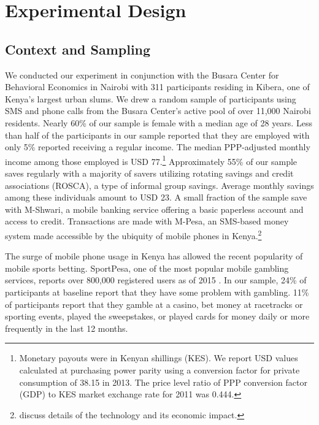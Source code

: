 \documentclass[11pt]{article}
\begin{document}
\section{Experimental Design} \label{sec:design}

	\subsection{Context and Sampling}

		We conducted our experiment in conjunction with the Busara Center for Behavioral Economics in Nairobi with 311 participants residing in Kibera, one of Kenya's largest urban slums. We drew a random sample of participants using SMS and phone calls from the Busara Center's active pool of over 11,000 Nairobi residents. Nearly 60\% of our sample is female with a median age of 28 years. Less than half of the participants in our sample reported that they are employed with only 5\% reported receiving a regular income. The median PPP-adjusted monthly income among those employed is USD 77.\footnote{Monetary payouts were in Kenyan shillings (KES). We report USD values calculated at purchasing power parity using a conversion factor for private consumption of 38.15 in 2013. The price level ratio of PPP conversion factor (GDP) to KES market exchange rate for 2011 was 0.444.} Approximately 55\% of our sample saves regularly with a majority of savers utilizing rotating savings and credit associations (ROSCA), a type of informal group savings. Average monthly savings among these individuals amount to USD 23. A small fraction of the sample save with M-Shwari, a mobile banking service offering a basic paperless account and access to credit. Transactions are made with M-Pesa, an SMS-based money system made accessible by the ubiquity of mobile phones in Kenya.\footnote{\textcite{jack_mobile_2011} discuss details of the technology and its economic impact.}

		The surge of mobile phone usage in Kenya has allowed the recent popularity of mobile sports betting. SportPesa, one of the most popular mobile gambling services, reports over 800,000 registered users as of 2015 \parencite{kemibaro_sportpesa_2015}. In our sample, 24\% of participants at baseline report that they have some problem with gambling. 11\% of participants report that they gamble at a casino, bet money at racetracks or sporting events, played the sweepstakes, or played cards for money daily or more frequently in the last 12 months.

\end{document}
